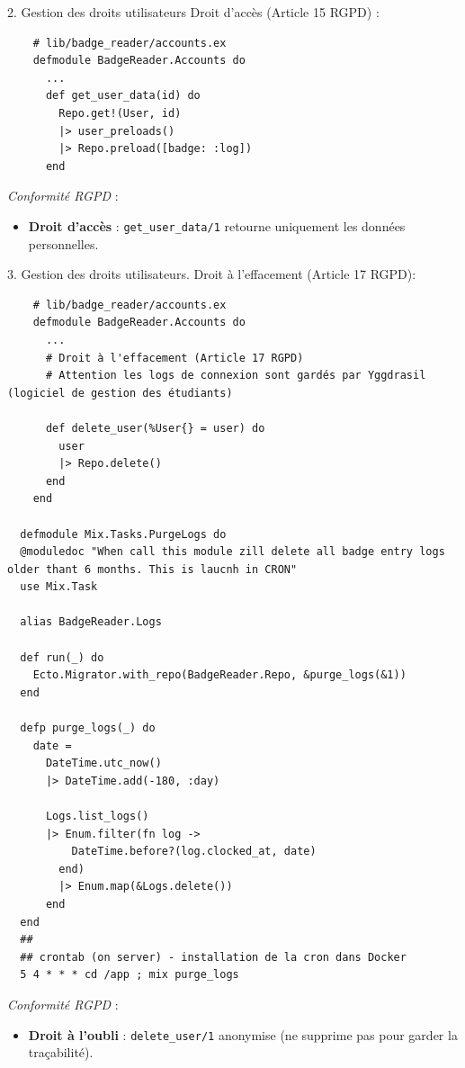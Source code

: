 \begin{for_you}{2. Gestion des droits utilisateurs Droit d'accès (Article 15 RGPD) :}
    \begin{lstlisting}
    # lib/badge_reader/accounts.ex
    defmodule BadgeReader.Accounts do
      ...
      def get_user_data(id) do
        Repo.get!(User, id)
        |> user_preloads()
        |> Repo.preload([badge: :log])
      end
    \end{lstlisting}

    \textit{Conformité RGPD} :
    \begin{itemize}
        \item \textbf{Droit d’accès} : \texttt{get\_user\_data/1} retourne uniquement les données personnelles.
    \end{itemize}
\end{for_you}

\textbf{\newline}

\begin{for_you}{3. Gestion des droits utilisateurs. Droit à l'effacement (Article 17 RGPD):}
    \begin{lstlisting}
    # lib/badge_reader/accounts.ex
    defmodule BadgeReader.Accounts do
      ...
      # Droit à l'effacement (Article 17 RGPD)
      # Attention les logs de connexion sont gardés par Yggdrasil (logiciel de gestion des étudiants)

      def delete_user(%User{} = user) do
        user
        |> Repo.delete()
      end
    end

  defmodule Mix.Tasks.PurgeLogs do
  @moduledoc "When call this module zill delete all badge entry logs older thant 6 months. This is laucnh in CRON"
  use Mix.Task

  alias BadgeReader.Logs

  def run(_) do
    Ecto.Migrator.with_repo(BadgeReader.Repo, &purge_logs(&1))
  end

  defp purge_logs(_) do
    date =
      DateTime.utc_now()
      |> DateTime.add(-180, :day)

      Logs.list_logs()
      |> Enum.filter(fn log ->
          DateTime.before?(log.clocked_at, date)
        end)
        |> Enum.map(&Logs.delete())
      end
  end
  ##
  ## crontab (on server) - installation de la cron dans Docker
  5 4 * * * cd /app ; mix purge_logs

\end{lstlisting}

    \textit{Conformité RGPD} :
    \begin{itemize}
        \item \textbf{Droit à l’oubli} : \texttt{delete\_user/1} anonymise (ne supprime pas pour garder la traçabilité).
    \end{itemize}
\end{for_you}

